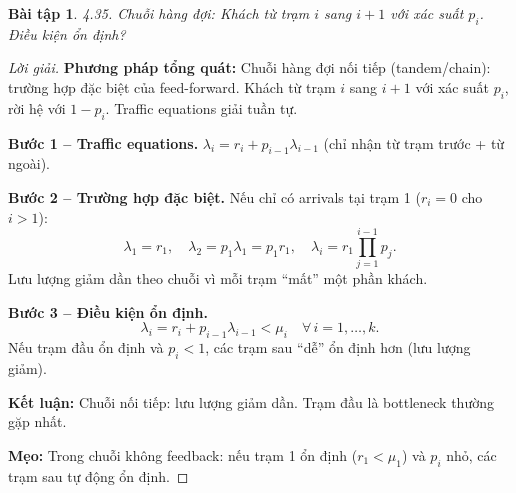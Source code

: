 \documentclass[8pt,a4paper]{article}
\newtheorem{exercise}{Bài tập}
\newenvironment{solution}{\begin{proof}[Lời giải]}{\end{proof}}
\begin{document}
\begin{exercise}
4.35. Chuỗi hàng đợi: Khách từ trạm $i$ sang $i+1$ với xác suất $p_i$. Điều kiện ổn định?
\end{exercise}
\begin{solution}
\textbf{Phương pháp tổng quát:} Chuỗi hàng đợi nối tiếp (tandem/chain): trường hợp đặc biệt của feed-forward. Khách từ trạm $i$ sang $i+1$ với xác suất $p_i$, rời hệ với $1-p_i$. Traffic equations giải tuần tự.

\textbf{Bước 1 -- Traffic equations.} $\lambda_i = r_i + p_{i-1}\lambda_{i-1}$ (chỉ nhận từ trạm trước + từ ngoài).

\textbf{Bước 2 -- Trường hợp đặc biệt.} Nếu chỉ có arrivals tại trạm 1 ($r_i = 0$ cho $i > 1$):
\[
\lambda_1 = r_1, \quad \lambda_2 = p_1 \lambda_1 = p_1 r_1, \quad \lambda_i = r_1 \prod_{j=1}^{i-1} p_j.
\]
Lưu lượng giảm dần theo chuỗi vì mỗi trạm ``mất'' một phần khách.

\textbf{Bước 3 -- Điều kiện ổn định.}
\[
\boxed{\lambda_i = r_i + p_{i-1}\lambda_{i-1} < \mu_i \quad \forall\, i = 1, \dots, k}.
\]
Nếu trạm đầu ổn định và $p_i < 1$, các trạm sau ``dễ'' ổn định hơn (lưu lượng giảm).

\textbf{Kết luận:} Chuỗi nối tiếp: lưu lượng giảm dần. Trạm đầu là bottleneck thường gặp nhất.

\textbf{Mẹo:} Trong chuỗi không feedback: nếu trạm 1 ổn định ($r_1 < \mu_1$) và $p_i$ nhỏ, các trạm sau tự động ổn định.
\end{solution}
\end{document}

